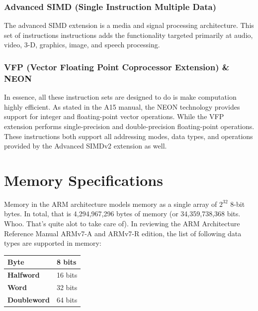 \documentclass[12pt]{scrreprt}
\begin{document}
		\subsection{Advanced SIMD (Single Instruction Multiple Data)}
			The advanced SIMD extension is a media and signal processing architecture.
			This set of instructions instructions adds the functionality targeted primarily at audio, video, 3-D, graphics, image, and speech processing.
		
		\subsection{VFP (Vector Floating Point Coprocessor Extension) \& NEON}
			In essence, all these instruction sets are designed to do is make computation highly efficient.
			As stated in the A15 manual, the NEON technology provides support for integer and floating-point vector operations.
			While the VFP extension performs single-precision and double-precision floating-point operations.
			These instructions both support all addressing modes, data types, and operations provided by the Advanced SIMDv2 extension as well.

{\let\clearpage\relax\chapter{Memory Specifications}}

	Memory in the ARM architecture models memory as a single array of $2^{32}$ 8-bit bytes.
	In total, that is 4,294,967,296 bytes of memory (or 34,359,738,368 bits. Whoo. That's quite alot to take care of). In reviewing the ARM Architecture Reference Manual ARMv7-A and ARMv7-R edition, the list of following data types are supported in memory:


	\begin{center}
		\begin{tabular}{|l|l|}
		\hline
			\bfseries Byte & 8 bits \\ \hline
			\bfseries Halfword & 16 bits \\ \hline
			\bfseries Word & 32 bits \\ \hline
			\bfseries Doubleword & 64 bits \\ \hline
		\end{tabular}
	\end{center}
\end{document}
